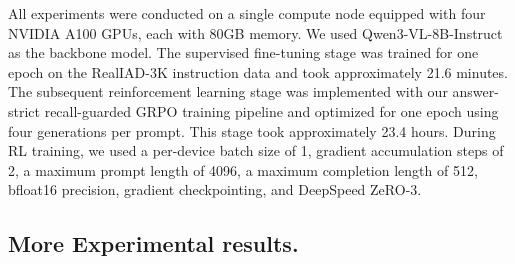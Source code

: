 \documentclass{llmxive}
\begin{document}
{\begin{table}[htbp]
\vspace{-2mm}
\centering
{}
\label{tab:reward_ablation}
\caption{\textbf{Sensitivity Analysis of Reward Hyperparameters.} We investigate the impact of the scaling factors ($\alpha, \beta, \gamma$) on IndusAgent's performance. Notably, a naïve uniform weighting ($\alpha=\beta=\gamma=1$) slightly degrades performance due to reward distraction. In contrast, our empirically tuned configuration ($\alpha=0.8, \beta=0.6, \gamma=0.5$) achieves the optimal balance between task efficacy and structural compliance.}
\end{table}

  All experiments were conducted on a single compute node equipped with four NVIDIA A100 GPUs, each with 80GB memory. We used Qwen3-VL-8B-Instruct as the backbone model. The supervised
  fine-tuning stage was trained for one epoch on the RealIAD-3K instruction data and took approximately 21.6 minutes. The subsequent reinforcement learning stage was implemented with our
  answer-strict recall-guarded GRPO training pipeline and optimized for one epoch using four generations per prompt. This stage took approximately 23.4 hours. During RL training, we
  used a per-device batch size of 1, gradient accumulation steps of 2, a maximum prompt length of 4096, a maximum completion length of 512, bfloat16 precision, gradient checkpointing, and DeepSpeed ZeRO-3.



\subsection{More Experimental results.}

}
\end{document}
